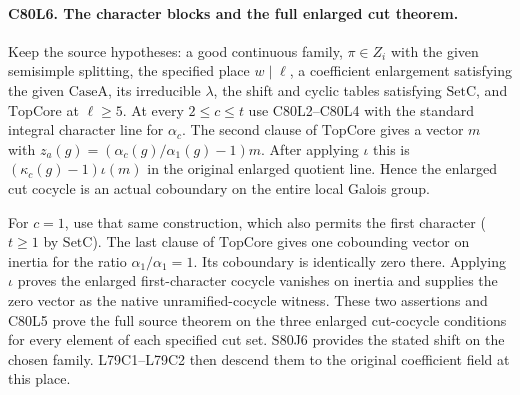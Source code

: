 \paragraph{C80L6. The character blocks and the full enlarged cut theorem.}
Keep the source hypotheses: a good continuous family, $\pi\in Z_i$
with the given semisimple splitting, the specified place
$w\mid\ell$, a coefficient enlargement satisfying the given
$\mathrm{CaseA}$, its irreducible $\lambda$, the shift and cyclic
tables satisfying $\mathrm{SetC}$, and $\mathrm{TopCore}$ at
$\ell\ge5$. At every $2\le c\le t$ use C80L2--C80L4 with
the standard integral character line for $\alpha_c$. The second
clause of $\mathrm{TopCore}$ gives a vector $m$ with
$z_a(g)=(\alpha_c(g)/\alpha_1(g)-1)m$. After applying
$\iota$ this is $(\kappa_c(g)-1)\iota(m)$ in the original
enlarged quotient line. Hence the enlarged cut cocycle is an
actual coboundary on the entire local Galois group.

For $c=1$, use that same construction, which also permits the first
character ($t\ge1$ by $\mathrm{SetC}$). The last clause of
$\mathrm{TopCore}$ gives one cobounding vector on inertia for the
ratio $\alpha_1/\alpha_1=1$. Its coboundary is identically zero
there. Applying $\iota$ proves the enlarged first-character
cocycle vanishes on inertia and supplies the zero vector as the
native unramified-cocycle witness. These two assertions and C80L5
prove the full source theorem on the three enlarged cut-cocycle
conditions for every element of each specified cut set. S80J6
provides the stated shift on the chosen family. L79C1--L79C2
then descend them to the original coefficient field at this place.
